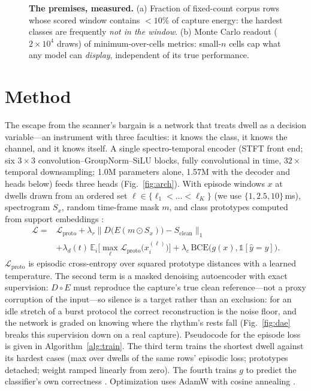 \documentclass[10pt,twocolumn]{article}
\begin{document}
\begin{figure}[t]
\begin{minipage}[t]{0.50\textwidth}
\end{minipage}
\caption{\textbf{The premises, measured.} (a) Fraction of fixed-count
corpus rows whose scored window contains ${<}10\%$ of capture energy: the
hardest classes are frequently \emph{not in the window}. (b) Monte Carlo
readout ($2{\times}10^4$ draws) of minimum-over-cells metrics: small-$n$
cells cap what any model can \emph{display}, independent of its true
performance.}
\label{fig:diag}
\end{figure}

\section{Method}
\label{sec:model}
The escape from the scanner's bargain is a network that treats dwell as a
decision variable---an instrument with three faculties: it knows the class,
it knows the channel, and it knows itself. A single spectro-temporal encoder (STFT front end; six
$3{\times}3$ convolution--GroupNorm--SiLU blocks, fully convolutional in
time, $32\times$ temporal downsampling; 1.0M parameters alone, 1.57M with
the decoder and heads below) feeds three heads (Fig.~\ref{fig:arch}). With
episode windows $x$ at dwells drawn from an ordered set
$\ell \in \{\ell_1 < \dots < \ell_K\}$ (we use $\{1, 2.5, 10\}$\,ms),
spectrogram $S_x$, random time-frame mask $m$, and class prototypes
computed from support embeddings \cite{snell2017}:
\begin{align*}
\mathcal{L} ={}& \mathcal{L}_{\mathrm{proto}}
 + \lambda_r \big\lVert D\!\big(E(m \odot S_x)\big) - S_{\mathrm{clean}}
   \big\rVert_1 \\
 &+ \lambda_d(t)\,\mathbb{E}_i\Big[\max_{\ell}
   \mathcal{L}_{\mathrm{proto}}\big(x_i^{(\ell)}\big)\Big]
 + \lambda_c\,\mathrm{BCE}\big(g(x), \mathbb{1}[\hat y = y]\big).
\end{align*}
$\mathcal{L}_{\mathrm{proto}}$ is episodic cross-entropy over squared
prototype distances with a learned temperature. The second term is a
masked denoising autoencoder \cite{vincent2010,he2022} with exact
supervision: $D\!\circ\!E$ must reproduce the capture's true clean
reference---not a proxy corruption of the input---so silence is a target
rather than an exclusion: for an idle stretch of a burst protocol the
correct reconstruction is the noise floor, and the network is graded on
knowing where the rhythm's rests fall
(Fig.~\ref{fig:dae} breaks this supervision down on a real capture).
Pseudocode for the episode loss is given in Algorithm~\ref{alg:train}. The third term trains the
shortest dwell against its hardest cases (max over dwells of the same
rows' episodic loss; prototypes detached; weight ramped linearly from
zero). The fourth trains $g$ to predict the classifier's own correctness
\cite{devries2018,hendrycks2017}. Optimization uses AdamW with cosine
annealing \cite{loshchilov2019}.
\end{document}
